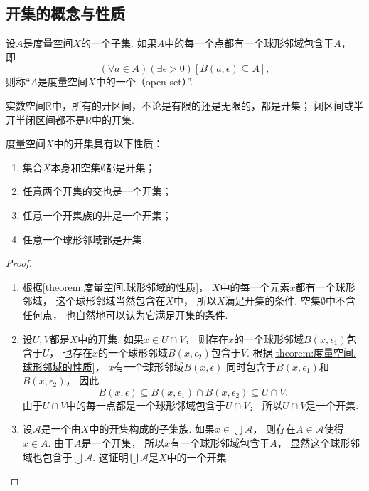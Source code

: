 \subsection{开集的概念与性质}
\begin{definition}\label{definition:度量空间.开集的概念}
设\(A\)是度量空间\(X\)的一个子集.
如果\(A\)中的每一个点都有一个球形邻域包含于\(A\)，
即\[
	(\forall a \in A)
	(\exists\epsilon>0)
	[B(a,\epsilon) \subseteq A],
\]
则称“\(A\)是度量空间\(X\)中的一个（open set）”.
\end{definition}

\begin{example}
实数空间\(\mathbb{R}\)中，所有的开区间，不论是有限的还是无限的，都是开集；
闭区间或半开半闭区间都不是\(\mathbb{R}\)中的开集.
\end{example}

\begin{theorem}\label{theorem:度量空间.开集的性质}
度量空间\(X\)中的开集具有以下性质：
\begin{enumerate}
	\item 集合\(X\)本身和空集\(\emptyset\)都是开集；
	\item 任意两个开集的交也是一个开集；
	\item 任意一个开集族的并是一个开集；
	\item 任意一个球形邻域都是开集.
\end{enumerate}
\begin{proof}
\begin{enumerate}
	\item 根据\cref{theorem:度量空间.球形邻域的性质}，
	\(X\)中的每一个元素\(x\)都有一个球形邻域，
	这个球形邻域当然包含在\(X\)中，
	所以\(X\)满足开集的条件.
	空集\(\emptyset\)中不含任何点，
	也自然地可以认为它满足开集的条件.

	\item 设\(U,V\)都是\(X\)中的开集.
	如果\(x \in U \cap V\)，
	则存在\(x\)的一个球形邻域\(B(x,\epsilon_1)\)包含于\(U\)，
	也存在\(x\)的一个球形邻域\(B(x,\epsilon_2)\)包含于\(V\).
	根据\cref{theorem:度量空间.球形邻域的性质}，
	\(x\)有一个球形邻域\(B(x,\epsilon)\)
	同时包含于\(B(x,\epsilon_1)\)和\(B(x,\epsilon_2)\)，
	因此\[
		B(x,\epsilon)
		\subseteq
		B(x,\epsilon_1) \cap B(x,\epsilon_2)
		\subseteq
		U \cap V.
	\]
	由于\(U \cap V\)中的每一点都是一个球形邻域包含于\(U \cap V\)，
	所以\(U \cap V\)是一个开集.

	\item 设\(\mathscr{A}\)是一个由\(X\)中的开集构成的子集族.
	如果\(x \in \bigcup \mathscr{A}\)，
	则存在\(A \in \mathscr{A}\)使得\(x \in A\).
	由于\(A\)是一个开集，
	所以\(x\)有一个球形邻域包含于\(A\)，
	显然这个球形邻域也包含于\(\bigcup \mathscr{A}\).
	这证明\(\bigcup \mathscr{A}\)是\(X\)中的一个开集.
	\qedhere
\end{enumerate}
\end{proof}
\end{theorem}

